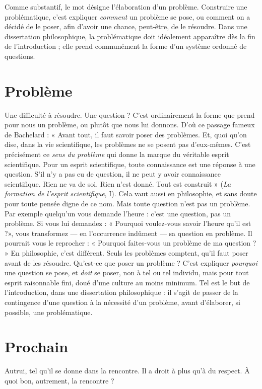 Comme substantif, le mot désigne l'élaboration d’un problème. Construire
une problématique, c’est expliquer {\it comment} un problème se pose, ou comment
on a décidé de le poser, afin d’avoir une chance, peut-être, de le résoudre. Dans
une dissertation philosophique, la problématique doit idéalement apparaître
dès la fin de l’introduction ; elle prend communément la forme d’un système
ordonné de questions.

\section{Problème}
Une difficulté à résoudre. Une question ? C’est ordinairement
la forme que prend pour nous un problème, ou plutôt que
nous lui donnons. D’où ce passage fameux de Bachelard : « Avant tout, il faut
savoir poser des problèmes. Et, quoi qu’on dise, dans la vie scientifique, les problèmes
ne se posent pas d’eux-mêmes. C’est précisément ce {\it sens du problème}
qui donne la marque du véritable esprit scientifique. Pour un esprit scientifique,
toute connaissance est une réponse à une question. S’il n’y a pas eu de
question, il ne peut y avoir connaissance scientifique. Rien ne va de soi. Rien
n'est donné. Tout est construit » ({\it La formation de l'esprit scientifique}, I). Cela
vaut aussi en philosophie, et sans doute pour toute pensée digne de ce nom.
Mais toute question n’est pas un problème. Par exemple quelqu'un vous
demande l'heure : c’est une question, pas un problème. Si vous lui demandez :
« Pourquoi voulez-vous savoir l’heure qu’il est ?», vous transformez — en
l'occurrence indûment — sa question en problème. Il pourrait vous le
reprocher : « Pourquoi faites-vous un problème de ma question ? » En philosophie,
c’est différent. Seuls les problèmes comptent, qu’il faut poser avant de les
résoudre. Qu'est-ce que poser un problème ? C’est expliquer {\it pourquoi} une
question se pose, et {\it doit} se poser, non à tel ou tel individu, mais pour tout
esprit raisonnable fini, doué d’une culture au moins minimum. Tel est le but
de l'introduction, dans une dissertation philosophique : il s’agit de passer de la
contingence d’une question à la nécessité d’un problème, avant d’élaborer, si
possible, une problématique.

\section{Prochain}
Autrui, tel qu’il se donne dans la rencontre. Il a droit à plus
qu’à du respect. À quoi bon, autrement, la rencontre ?

